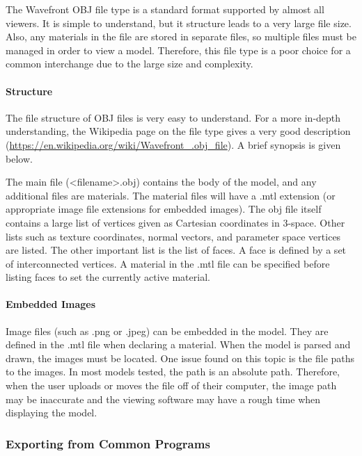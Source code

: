            The Wavefront OBJ file type is a standard format supported by almost all viewers.  It is simple to understand, but it structure leads to a very large file size.  Also, any materials in the file are stored in separate files, so multiple files must be managed in order to view a model.  Therefore, this file type is a poor choice for a common interchange due to the large size and complexity.

            \paragraph{Structure}

                The file structure of OBJ files is very easy to understand.  For a more in-depth understanding, the Wikipedia page on the file type gives a very good description (\url{https://en.wikipedia.org/wiki/Wavefront_.obj_file}).  A brief synopsis is given below.

                The main file (<filename>.obj) contains the body of the model, and any additional files are materials.  The material files will have a .mtl extension (or appropriate image file extensions for embedded images).  The obj file itself contains a large list of vertices given as Cartesian coordinates in 3-space.  Other lists such as texture coordinates, normal vectors, and parameter space vertices are listed.  The other important list is the list of faces.  A face is defined by a set of interconnected vertices.  A material in the .mtl file can be specified before listing faces to set the currently active material.

            \paragraph{Embedded Images}

                Image files (such as .png or .jpeg) can be embedded in the model.  They are defined in the .mtl file when declaring a material.  When the model is parsed and drawn, the images must be located.  One issue found on this topic is the file paths to the images.  In most models tested, the path is an absolute path.  Therefore, when the user uploads or moves the file off of their computer, the image path may be inaccurate and the viewing software may have a rough time when displaying the model.

        \subsubsection{Exporting from Common Programs}

